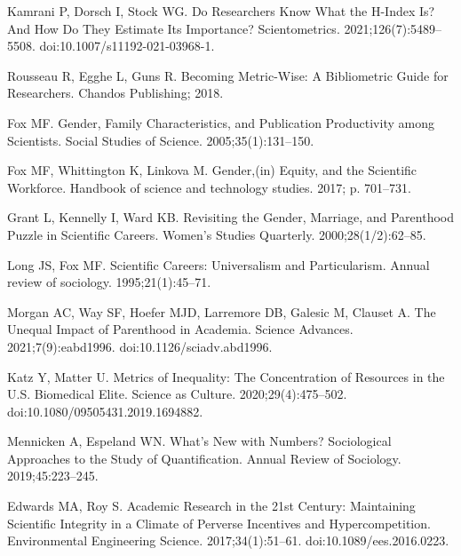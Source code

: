 \documentclass[
  10pt,
  letterpaper,
]{article}
\begin{document}
\begin{thebibliography}{10}
Kamrani P, Dorsch I, Stock WG.
\newblock Do Researchers Know What the H-Index Is? {{And}} How Do They Estimate Its Importance?
\newblock Scientometrics. 2021;126(7):5489--5508.
\newblock doi:{10.1007/s11192-021-03968-1}.

Rousseau R, Egghe L, Guns R.
\newblock Becoming {{Metric-Wise}}: {{A Bibliometric Guide}} for {{Researchers}}.
\newblock Chandos Publishing; 2018.

Fox MF.
\newblock Gender, Family Characteristics, and Publication Productivity among Scientists.
\newblock Social Studies of Science. 2005;35(1):131--150.

Fox MF, Whittington K, Linkova M.
\newblock Gender,(in) Equity, and the Scientific Workforce.
\newblock Handbook of science and technology studies. 2017; p. 701--731.

Grant L, Kennelly I, Ward KB.
\newblock Revisiting the Gender, Marriage, and Parenthood Puzzle in Scientific Careers.
\newblock Women's Studies Quarterly. 2000;28(1/2):62--85.

Long JS, Fox MF.
\newblock Scientific Careers: {{Universalism}} and Particularism.
\newblock Annual review of sociology. 1995;21(1):45--71.

Morgan AC, Way SF, Hoefer MJD, Larremore DB, Galesic M, Clauset A.
\newblock The Unequal Impact of Parenthood in Academia.
\newblock Science Advances. 2021;7(9):eabd1996.
\newblock doi:{10.1126/sciadv.abd1996}.

Katz Y, Matter U.
\newblock Metrics of {{Inequality}}: {{The Concentration}} of {{Resources}} in the {{U}}.{{S}}. {{Biomedical Elite}}.
\newblock Science as Culture. 2020;29(4):475--502.
\newblock doi:{10.1080/09505431.2019.1694882}.

Mennicken A, Espeland WN.
\newblock What's New with Numbers? {{Sociological}} Approaches to the Study of Quantification.
\newblock Annual Review of Sociology. 2019;45:223--245.

Edwards MA, Roy S.
\newblock Academic {{Research}} in the 21st {{Century}}: {{Maintaining Scientific Integrity}} in a {{Climate}} of {{Perverse Incentives}} and {{Hypercompetition}}.
\newblock Environmental Engineering Science. 2017;34(1):51--61.
\newblock doi:{10.1089/ees.2016.0223}.


\end{thebibliography}
\end{document}
